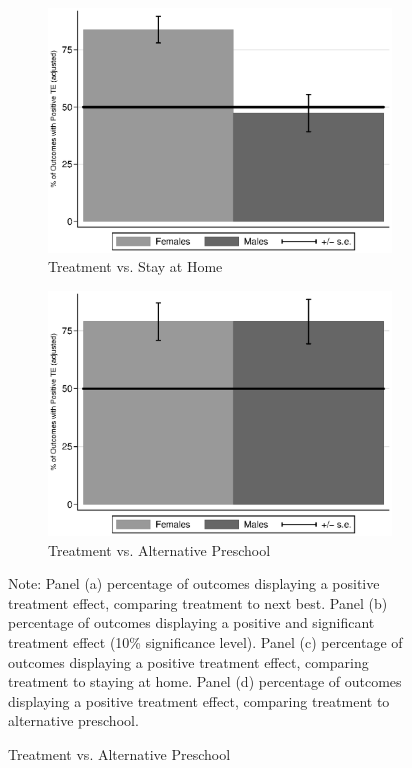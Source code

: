 \begin{figure}
\begin{subfigure}[h]{0.4\textwidth}
		\caption{ Treatment vs. Stay at Home} \label{fig:ppositivehome}
		\includegraphics[width=\textwidth]{output/epan_ipw_p0_all.eps}
\end{subfigure}%
\begin{subfigure}[h]{0.4\textwidth}
	\centering
	\caption{Treatment vs. Alternative Preschool} \label{fig:ppositivealternative}
		\includegraphics[width=\textwidth]{output/epan_ipw_p1_all.eps}
\end{subfigure}
\footnotesize \justify
Note: Panel (a) percentage of outcomes displaying a positive treatment effect, comparing treatment to next best. Panel (b) percentage of outcomes displaying a positive and significant treatment effect (10\% significance level). Panel (c) percentage of outcomes displaying a positive treatment effect, comparing treatment to staying at home. Panel (d) percentage of outcomes displaying a positive treatment effect, comparing treatment to alternative preschool.\\
\end{figure}

